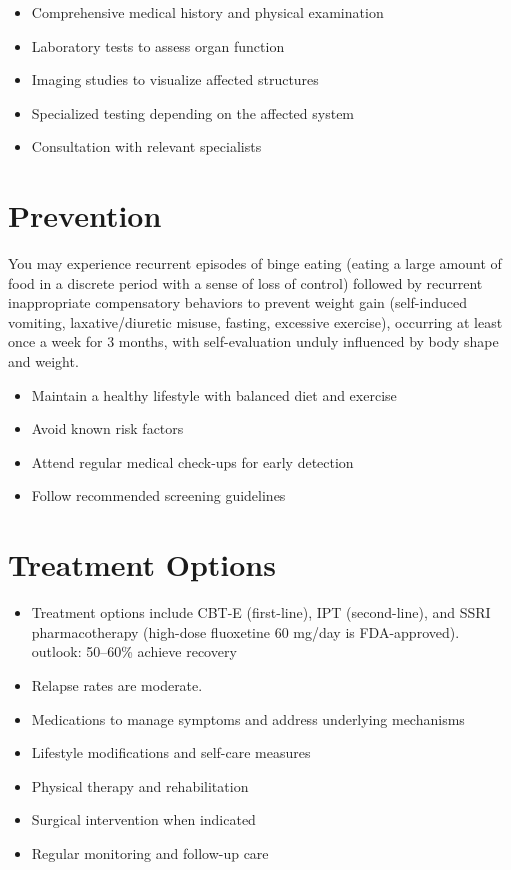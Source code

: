 \begin{itemize}[noitemsep]
  \item Comprehensive medical history and physical examination
  \item Laboratory tests to assess organ function
  \item Imaging studies to visualize affected structures
  \item Specialized testing depending on the affected system
  \item Consultation with relevant specialists
\end{itemize}
\section{Prevention}
You may experience recurrent episodes of binge eating (eating a large amount of food in a discrete period with a sense of loss of control) followed by recurrent inappropriate compensatory behaviors to prevent weight gain (self-induced vomiting, laxative/diuretic misuse, fasting, excessive exercise), occurring at least once a week for 3 months, with self-evaluation unduly influenced by body shape and weight.

\begin{itemize}[noitemsep]
  \item Maintain a healthy lifestyle with balanced diet and exercise
  \item Avoid known risk factors
  \item Attend regular medical check-ups for early detection
  \item Follow recommended screening guidelines
\end{itemize}
\section{Treatment Options}
\begin{itemize}[noitemsep]
  \item Treatment options include CBT-E (first-line), IPT (second-line), and SSRI pharmacotherapy (high-dose fluoxetine 60 mg/day is FDA-approved). outlook: 50--60\% achieve recovery
  \item Relapse rates are moderate.
  \item Medications to manage symptoms and address underlying mechanisms
  \item Lifestyle modifications and self-care measures
  \item Physical therapy and rehabilitation
  \item Surgical intervention when indicated
  \item Regular monitoring and follow-up care
\end{itemize}

